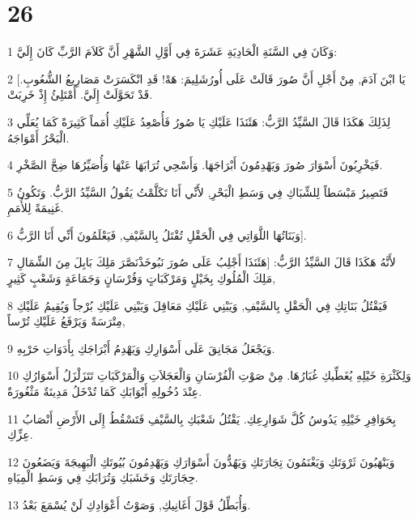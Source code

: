 \chapter{26}

\par 1 وَكَانَ فِي السَّنَةِ الْحَادِيَةِ عَشَرَةَ فِي أَوَّلِ الشَّهْرِ أَنَّ كَلاَمَ الرَّبِّ كَانَ إِلَيَّ:
\par 2 [يَا ابْنَ آدَمَ, مِنْ أَجْلِ أَنَّ صُورَ قَالَتْ عَلَى أُورُشَلِيمَ: هَهْ! قَدِ انْكَسَرَتْ مَصَارِيعُ الشُّعُوبِ. قَدْ تَحَوَّلَتْ إِلَيَّ. أَمْتَلِئُ إِذْ خَرِبَتْ.
\par 3 لِذَلِكَ هَكَذَا قَالَ السَّيِّدُ الرَّبُّ: هَئَنَذَا عَلَيْكِ يَا صُورُ فَأُصْعِدُ عَلَيْكِ أُمَماً كَثِيرَةً كَمَا يُعَلِّي الْبَحْرُ أَمْوَاجَهُ.
\par 4 فَيَخْرِبُونَ أَسْوَارَ صُورَ وَيَهْدِمُونَ أَبْرَاجَهَا. وَأَسْحِي تُرَابَهَا عَنْهَا وَأُصَيِّرُهَا ضِحَّ الصَّخْرِ.
\par 5 فَتَصِيرُ مَبْسَطاً لِلشِّبَاكِ فِي وَسَطِ الْبَحْرِ, لأَنِّي أَنَا تَكَلَّمْتُ يَقُولُ السَّيِّدُ الرَّبُّ. وَتَكُونُ غَنِيمَةً لِلأُمَمِ.
\par 6 وَبَنَاتُهَا اللَّوَاتِي فِي الْحَقْلِ تُقْتَلُ بِالسَّيْفِ, فَيَعْلَمُونَ أَنِّي أَنَا الرَّبُّ].
\par 7 لأَنَّهُ هَكَذَا قَالَ السَّيِّدُ الرَّبُّ: [هَئَنَذَا أَجْلِبُ عَلَى صُورَ نَبُوخَذْنَصَّرَ مَلِكَ بَابِلَ مِنَ الشِّمَالِ مَلِكَ الْمُلُوكِ بِخَيْلٍ وَمَرْكَبَاتٍ وَفُرْسَانٍ وَجَمَاعَةٍ وَشَعْبٍ كَثِيرٍ,
\par 8 فَيَقْتُلُ بَنَاتِكِ فِي الْحَقْلِ بِالسَّيْفِ, وَيَبْنِي عَلَيْكِ مَعَاقِلَ وَيَبْنِي عَلَيْكِ بُرْجاً وَيُقِيمُ عَلَيْكِ مِتْرَسَةً وَيَرْفَعُ عَلَيْكِ تُرْساً,
\par 9 وَيَجْعَلُ مَجَانِقَ عَلَى أَسْوَارِكِ وَيَهْدِمُ أَبْرَاجَكِ بِأَدَوَاتِ حَرْبِهِ.
\par 10 وَلِكَثْرَةِ خَيْلِهِ يُغَطِّيكِ غُبَارُهَا. مِنْ صَوْتِ الْفُرْسَانِ وَالْعَجَلاَتِ وَالْمَرْكَبَاتِ تَتَزَلْزَلُ أَسْوَارُكِ عِنْدَ دُخُولِهِ أَبْوَابَكِ كَمَا تُدْخَلُ مَدِينَةٌ مَثْغُورَةٌ.
\par 11 بِحَوَافِرِ خَيْلِهِ يَدُوسُ كُلَّ شَوَارِعِكِ. يَقْتُلُ شَعْبَكِ بِالسَّيْفِ فَتَسْقُطُ إِلَى الأَرْضِ أَنْصَابُ عِزِّكِ.
\par 12 وَيَنْهَبُونَ ثَرْوَتَكِ وَيَغْنَمُونَ تِجَارَتَكِ وَيَهُدُّونَ أَسْوَارَكِ وَيَهْدِمُونَ بُيُوتَكِ الْبَهِيجَةَ وَيَضَعُونَ حِجَارَتَكِ وَخَشَبَكِ وَتُرَابَكِ فِي وَسَطِ الْمِيَاهِ.
\par 13 وَأُبَطِّلُ قَوْلَ أَغَانِيكِ, وَصَوْتُ أَعْوَادِكِ لَنْ يُسْمَعَ بَعْدُ.
